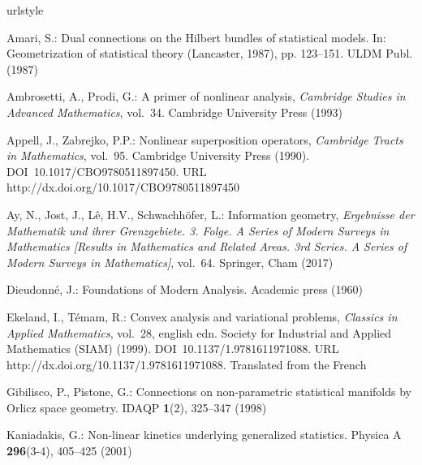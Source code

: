 \documentclass[graybox]{svmult}
\begin{document}
\begin{thebibliography}{10}
\providecommand{\url}[1]{{#1}}
\providecommand{\urlprefix}{URL }
\expandafter\ifx\csname urlstyle\endcsname\relax
  \providecommand{\doi}[1]{DOI~\discretionary{}{}{}#1}\else
  \providecommand{\doi}{DOI~\discretionary{}{}{}\begingroup
  \urlstyle{rm}\Url}\fi

Amari, S.: Dual connections on the {H}ilbert bundles of statistical models.
\newblock In: Geometrization of statistical theory (Lancaster, 1987), pp.
  123--151. ULDM Publ. (1987)

Ambrosetti, A., Prodi, G.: A primer of nonlinear analysis, \emph{Cambridge
  Studies in Advanced Mathematics}, vol.~34.
\newblock Cambridge University Press (1993)

Appell, J., Zabrejko, P.P.: Nonlinear superposition operators, \emph{Cambridge
  Tracts in Mathematics}, vol.~95.
\newblock Cambridge University Press (1990).
\newblock \doi{10.1017/CBO9780511897450}.
\newblock \urlprefix\url{http://dx.doi.org/10.1017/CBO9780511897450}

Ay, N., Jost, J., L\^e, H.V., Schwachh\"ofer, L.: Information geometry,
  \emph{Ergebnisse der Mathematik und ihrer Grenzgebiete. 3. Folge. A Series of
  Modern Surveys in Mathematics [Results in Mathematics and Related Areas. 3rd
  Series. A Series of Modern Surveys in Mathematics]}, vol.~64.
\newblock Springer, Cham (2017)

Dieudonn\'e, J.: Foundations of Modern Analysis.
\newblock Academic press (1960)

Ekeland, I., T\'emam, R.: Convex analysis and variational problems,
  \emph{Classics in Applied Mathematics}, vol.~28, english edn.
\newblock Society for Industrial and Applied Mathematics (SIAM) (1999).
\newblock \doi{10.1137/1.9781611971088}.
\newblock \urlprefix\url{http://dx.doi.org/10.1137/1.9781611971088}.
\newblock Translated from the French

Gibilisco, P., Pistone, G.: Connections on non-parametric statistical manifolds
  by {O}rlicz space geometry.
\newblock IDAQP \textbf{1}(2), 325--347 (1998)

Kaniadakis, G.: Non-linear kinetics underlying generalized statistics.
\newblock Physica A \textbf{296}(3-4), 405--425 (2001)


\end{thebibliography}
\end{document}
